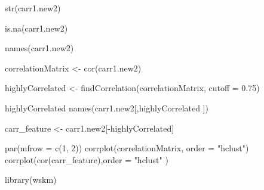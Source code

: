 \documentclass[
]{article}
\newenvironment{Shaded}{\begin{snugshade}}{\end{snugshade}}
\newcommand{\AttributeTok}[1]{\textcolor[rgb]{0.77,0.63,0.00}{#1}}
\newcommand{\DecValTok}[1]{\textcolor[rgb]{0.00,0.00,0.81}{#1}}
\newcommand{\FloatTok}[1]{\textcolor[rgb]{0.00,0.00,0.81}{#1}}
\newcommand{\FunctionTok}[1]{\textcolor[rgb]{0.00,0.00,0.00}{#1}}
\newcommand{\NormalTok}[1]{#1}
\newcommand{\OtherTok}[1]{\textcolor[rgb]{0.56,0.35,0.01}{#1}}
\newcommand{\SpecialCharTok}[1]{\textcolor[rgb]{0.00,0.00,0.00}{#1}}
\newcommand{\StringTok}[1]{\textcolor[rgb]{0.31,0.60,0.02}{#1}}
\begin{document}
\begin{Shaded}
\begin{Highlighting}[]
\FunctionTok{str}\NormalTok{(carr1.new2)}
\end{Highlighting}
\end{Shaded}

\begin{Shaded}
\begin{Highlighting}[]
\FunctionTok{is.na}\NormalTok{(carr1.new2)}
\end{Highlighting}
\end{Shaded}

\begin{Shaded}
\begin{Highlighting}[]
\FunctionTok{names}\NormalTok{(carr1.new2)}
\end{Highlighting}
\end{Shaded}

\begin{Shaded}
\begin{Highlighting}[]
\NormalTok{correlationMatrix }\OtherTok{\textless{}{-}} \FunctionTok{cor}\NormalTok{(carr1.new2)}

\NormalTok{highlyCorrelated }\OtherTok{\textless{}{-}} \FunctionTok{findCorrelation}\NormalTok{(correlationMatrix, }\AttributeTok{cutoff =} \FloatTok{0.75}\NormalTok{) }

\NormalTok{highlyCorrelated}
\FunctionTok{names}\NormalTok{(carr1.new2[,highlyCorrelated ])}
\end{Highlighting}
\end{Shaded}

\begin{Shaded}
\begin{Highlighting}[]
\NormalTok{carr\_feature }\OtherTok{\textless{}{-}}\NormalTok{ carr1.new2[}\SpecialCharTok{{-}}\NormalTok{highlyCorrelated]}

\FunctionTok{par}\NormalTok{(}\AttributeTok{mfrow =} \FunctionTok{c}\NormalTok{(}\DecValTok{1}\NormalTok{, }\DecValTok{2}\NormalTok{))}
\FunctionTok{corrplot}\NormalTok{(correlationMatrix, }\AttributeTok{order =} \StringTok{"hclust"}\NormalTok{)}
\FunctionTok{corrplot}\NormalTok{(}\FunctionTok{cor}\NormalTok{(carr\_feature),}\AttributeTok{order =} \StringTok{"hclust"}\NormalTok{ )}
\end{Highlighting}
\end{Shaded}

\begin{Shaded}
\begin{Highlighting}[]
\FunctionTok{library}\NormalTok{(wskm)}
\end{Highlighting}
\end{Shaded}
\end{document}
